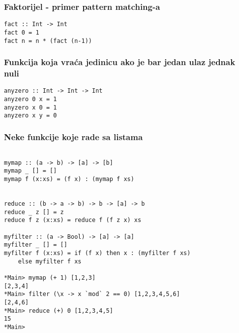 \documentclass{beamer}
\begin{document}
\begin{frame}[fragile]
\frametitle{Faktorijel - primer pattern matching-a} 
\begin{lstlisting}
fact :: Int -> Int
fact 0 = 1
fact n = n * (fact (n-1))
\end{lstlisting}
\end{frame}

\begin{frame}[fragile]
\frametitle{Funkcija koja vraća jedinicu ako je bar jedan ulaz jednak nuli}
\begin{lstlisting}
anyzero :: Int -> Int -> Int
anyzero 0 x = 1
anyzero x 0 = 1
anyzero x y = 0
\end{lstlisting}
\end{frame}


\begin{frame}[fragile]
\frametitle{Neke funkcije koje rade sa listama}
\begin{lstlisting}

mymap :: (a -> b) -> [a] -> [b]
mymap _ [] = []
mymap f (x:xs) = (f x) : (mymap f xs)


reduce :: (b -> a -> b) -> b -> [a] -> b 
reduce _ z [] = z 
reduce f z (x:xs) = reduce f (f z x) xs

myfilter :: (a -> Bool) -> [a] -> [a]
myfilter _ [] = [] 
myfilter f (x:xs) = if (f x) then x : (myfilter f xs) 
	else myfilter f xs

*Main> mymap (+ 1) [1,2,3]
[2,3,4]
*Main> filter (\x -> x `mod` 2 == 0) [1,2,3,4,5,6]
[2,4,6]
*Main> reduce (+) 0 [1,2,3,4,5]
15
*Main> 

\end{lstlisting}
\end{frame}
\end{document}
